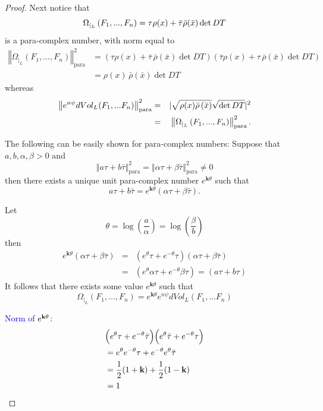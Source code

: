 \documentclass[12pt,letterpaper]{amsart}%
\numberwithin{mycounter}{section}
\theoremstyle{plain}
\numberwithin{equation}{section}
\theoremstyle{definition}
\begin{document}
\begin{proof}
Next notice that
\[
\Omega _{|_{L}}\left( F_{1},...,F_{n}\right) =\tau \rho (x)+\bar{\tau}\bar{%
\rho}(\bar{x})\det DT
\]%
is a
para-complex number, with norm equal to \[
\begin{aligned}
\left\Vert \Omega _{|_{L}}(F_{1},\ldots,F_{n}) \right\Vert_{\text{para}}^{2}
&= \left( \tau \rho(x) + \bar{\tau}\,\bar{\rho}(\bar{x}) \det DT \right)
   \left( \bar{\tau}\rho(x) + \tau\,\bar{\rho}(\bar{x}) \det DT \right) \\
&= \rho(x)\,\bar{\rho}(\bar{x}) \det DT
\end{aligned}
\]
whereas 
\begin{eqnarray*}
\left\Vert e^{n\psi }dVol_{L}(F_{1},...F_{n})\right\Vert _{\text{para}}^{2}
&=& | \sqrt{\rho (x)\bar{\rho}\left( \bar{x}\right) }\sqrt{\det DT} | ^2  \\
&=&\left\Vert \Omega _{|_{L}}\left( F_{1},...,F_{n}\right) \right\Vert _{%
\text{para}}^{2}.
\end{eqnarray*}

The following can be easily shown for para-complex numbers: Suppose that $a,b,\alpha,\beta >0$ and  
\[
\left\Vert a\tau +b\bar{\tau}\right\Vert _{\text{para}}^{2}=\left\Vert
\alpha \tau +\beta \bar{\tau}\right\Vert _{\text{para}}^{2}\neq 0
\]%
then there exists a unique unit para-complex number $e^{\mathbf{k}\theta }$ such
that 
\[
a\tau +b\bar{\tau}=e^{\mathbf{k}\theta }\left( \alpha \tau +\beta \bar{\tau}%
\right). 
\]%

\iffalse 
Let 
\[
\theta =\log (\frac{a}{\alpha })=\log \left( \frac{\beta }{b}\right) 
\]%
then 
\begin{eqnarray*}
e^{\mathbf{k}\theta }\left( \alpha \tau +\beta \bar{\tau}\right)  &=&\left(
e^{\theta }\tau +e^{-\theta }\tau \right) \left( \alpha \tau +\beta \bar{\tau%
}\right)  \\
&=&\left( e^{\theta }\alpha \tau +e^{-\theta }\beta \tau \right) =\left(
a\tau +b\tau \right) 
\end{eqnarray*}%
It follows that there exists some value $e^{\mathbf{k}\theta }$ such that 
\[
\Omega _{|_{L}}\left( F_{1},...,F_{n}\right) =e^{\mathbf{k}\theta }e^{n\psi
}dVol_{L}(F_{1},...F_{n})
\]

\textcolor{blue}{Norm of $e^{\textrm{\bf k}\theta}$:
\begin{align}
    &\Big(e^\theta \tau+e^{-\theta}\bar\tau\Big)\Big(e^\theta \bar\tau+e^{-\theta}\tau\Big) \\
    &= e^{\theta}e^{-\theta}\tau + e^{-\theta}e^{\theta}\bar\tau \\
    &= \frac{1}{2}(1+\textrm{\bf k}) + \frac{1}{2}(1-\textrm{\bf k}) \\
    &= 1
\end{align}
}


\end{proof}
\end{document}
